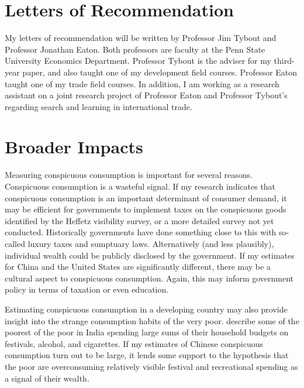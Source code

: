 \documentclass[a4paper,10pt]{article}
\begin{document}
\section{Letters of Recommendation}
My letters of recommendation will be written by Professor Jim Tybout and Professor Jonathan Eaton. Both professors are faculty at the Penn State University Economics Department.  Professor Tybout is the adviser for my third-year paper, and also taught one of my development field courses.  Professor Eaton taught one of my trade field courses.  In addition, I am working as a research assistant on a joint research project of Professor Eaton and Professor Tybout's regarding search and learning in international trade.

\section{Broader Impacts}
Measuring conspicuous consumption is important for several reasons.  Conspicuous consumption is a wasteful signal.  If my research indicates that conspicuous consumption is an important determinant of consumer demand, it may be efficient for governments to implement taxes on the conspicuous goods identified by the Heffetz visibility survey, or a more detailed survey not yet conducted.  Historically governments have done something close to this with so-called luxury taxes and sumptuary laws.  Alternatively (and less plausibly), individual wealth could be publicly disclosed by the government.  If my estimates for China and the United States are significantly different, there may be a cultural aspect to conspicuous consumption.  Again, this may inform government policy in terms of taxation or even education.

Estimating conspicuous consumption in a developing country may also provide insight into the strange consumption habits of the very poor.  \citet{BanerjeeDuflo2007} describe some of the poorest of the poor in India spending large sums of their household budgets on festivals, alcohol, and cigarettes.  If my estimates of Chinese conspicuous consumption turn out to be large, it lends some support to the hypothesis that the poor are overconsuming relatively visible festival and recreational spending as a signal of their wealth.

      



\end{document}
